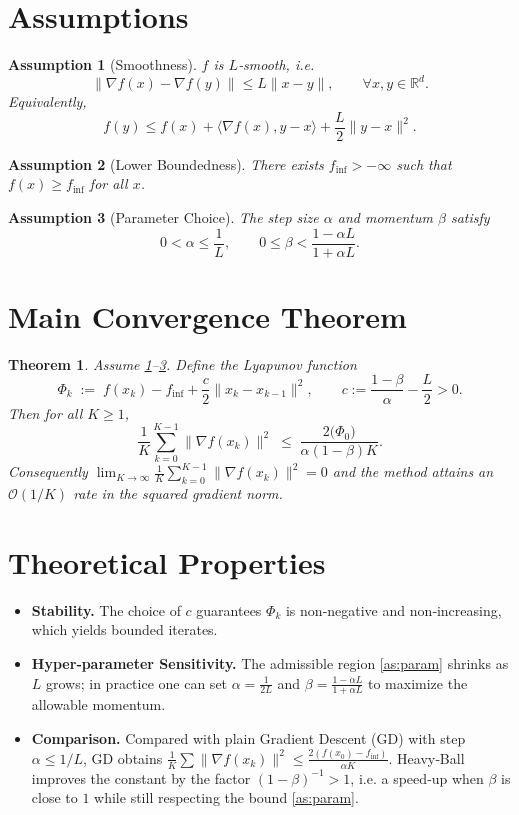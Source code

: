 \documentclass{article}
\newtheorem{theorem}{Theorem}
\newtheorem{assumption}{Assumption}
\begin{document}
\newpage
\section*{Assumptions}
\begin{assumption}[Smoothness]\label{as:Lsmooth}
$f$ is $L$‑smooth, i.e.
\[
\|\nabla f(x)-\nabla f(y)\|\le L\|x-y\|,\qquad\forall x,y\in\mathbb{R}^d .
\]
Equivalently,
\[
f(y)\le f(x)+\langle\nabla f(x),y-x\rangle+\frac{L}{2}\|y-x\|^2 .
\]
\end{assumption}
\begin{assumption}[Lower Boundedness]\label{as:lb}
There exists $f_{\inf}>-\infty$ such that $f(x)\ge f_{\inf}$ for all $x$.
\end{assumption}
\begin{assumption}[Parameter Choice]\label{as:param}
The step size $\alpha$ and momentum $\beta$ satisfy
\[
0<\alpha\le\frac{1}{L},\qquad 0\le\beta<\frac{1-\alpha L}{1+\alpha L}.
\]
\end{assumption}

\section*{Main Convergence Theorem}
\begin{theorem}\label{thm:hb}
Assume \ref{as:Lsmooth}–\ref{as:param}. Define the Lyapunov function
\[
\Phi_k \;:=\; f(x_k)-f_{\inf}+\frac{c}{2}\|x_k-x_{k-1}\|^2,
\qquad c:=\frac{1-\beta}{\alpha}-\frac{L}{2}>0 .
\]
Then for all $K\ge 1$,
\[
\frac{1}{K}\sum_{k=0}^{K-1}\|\nabla f(x_k)\|^2
\;\le\;
\frac{2\bigl(\Phi_0\bigr)}{\alpha(1-\beta)K}.
\tag{1}
\]
Consequently $\displaystyle\lim_{K\to\infty}\frac{1}{K}\sum_{k=0}^{K-1}\|\nabla f(x_k)\|^2=0$ and the method attains an $\mathcal{O}(1/K)$ rate in the squared gradient norm.
\end{theorem}

\section*{Theoretical Properties}
\begin{itemize}
\item \textbf{Stability.} The choice of $c$ guarantees $\Phi_k$ is non‑negative and non‑increasing, which yields bounded iterates.
\item \textbf{Hyper‑parameter Sensitivity.} The admissible region \eqref{as:param} shrinks as $L$ grows; in practice one can set $\alpha=\frac{1}{2L}$ and $\beta=\frac{1-\alpha L}{1+\alpha L}$ to maximize the allowable momentum.
\item \textbf{Comparison.} Compared with plain Gradient Descent (GD) with step $\alpha\le 1/L$, GD obtains $\frac{1}{K}\sum\|\nabla f(x_k)\|^2\le\frac{2(f(x_0)-f_{\inf})}{\alpha K}$.
Heavy‑Ball improves the constant by the factor $(1-\beta)^{-1}>1$, i.e. a speed‑up when $\beta$ is close to $1$ while still respecting the bound \eqref{as:param}.
\end{itemize}
\end{document}
